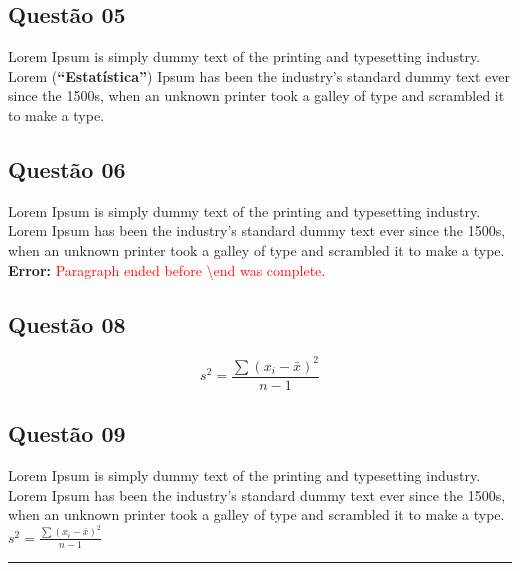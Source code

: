 \documentclass[portuguese]{article}
\begin{document}
	\subsection{Questão 05}
	Lorem Ipsum is simply dummy text of the printing and typesetting industry. Lorem (\textbf{``Estatística''}\label{subsec:ex5}) Ipsum has been the industry's standard dummy text ever since the 1500s, when an unknown printer took a galley of type and scrambled it to make a type.
	
	\subsection{Questão 06}\label{subsec:ex6}
	Lorem Ipsum is simply dummy text of the printing and typesetting industry. Lorem Ipsum has been the industry's standard dummy text ever since the 1500s, when an unknown printer took a galley of type and scrambled it to make a type.\textbf{ Error: }\textcolor{red}{Paragraph ended before \textbackslash end was complete}.
	
	\subsection{Questão 08}\label{subsec:ex8}
	\[
		s^2 = \frac{\sum \left(x_i - \bar{x}\right)^2}{n-1}
	\]
	
	\subsection{Questão 09}\label{subsec:ex9}
	Lorem Ipsum is simply dummy text of the printing and typesetting industry. Lorem Ipsum has been the industry's standard dummy text ever since the 1500s, when an unknown printer took a galley of type and scrambled it to make a type. \(s^2 = \frac{\sum \left(x_i - \bar{x} \right)^2}{n-1}\)
	
	\rule{\textwidth}{1.5pt}
	
\end{document}
